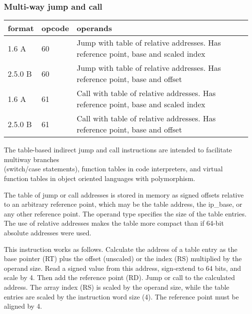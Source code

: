 \documentclass[forwardcom.tex]{subfiles}
\begin{document}
\subsubsection{Multi-way jump and call}
\label{table:multiwayJumpCallInstructions}
\begin{tabular}{|p{14mm}|p{12mm}|p{110mm}|}
\hline
\bfseries format & \bfseries opcode & \bfseries operands \\ \hline
1.6 A   & 60 & Jump with table of relative addresses. \linebreak Has reference point, base and scaled index  \\ \hline
2.5.0 B & 60 & Jump with table of relative addresses. \linebreak Has reference point, base and offset  \\ \hline
1.6 A   & 61 & Call with table of relative addresses. \linebreak Has reference point, base and scaled index    \\ \hline
2.5.0 B & 61 & Call with table of relative addresses. \linebreak Has reference point, base and offset \\ \hline
\end{tabular}
\vspace{2mm}

\label{jumpTableInstruction}
The table-based indirect jump and call instructions are intended to facilitate multiway branches \\
(switch/case statements), function tables in code interpreters, and virtual function tables in object oriented languages with polymorphism. 
\vspace{2mm}

The table of jump or call addresses is stored in memory as signed offsets relative to an arbitrary reference point, which may be the table address, the ip\_base, or any other reference point. The operand type specifies the size of the table entries. The use of relative addresses makes the table more compact than if 64-bit absolute addresses were used.
\vspace{2mm}

This instruction works as follows. Calculate the address of a table entry as the base pointer (RT) plus the offset (unscaled) or the index (RS) multiplied by the operand size. Read a signed value from this address, sign-extend to 64 bits, and scale by 4. Then add the reference point (RD). Jump or call to the calculated address. The array index (RS) is scaled by the operand size, while the table entries are scaled by the instruction word size (4). The reference point must be aligned by 4.
\vspace{2mm}
\end{document}
